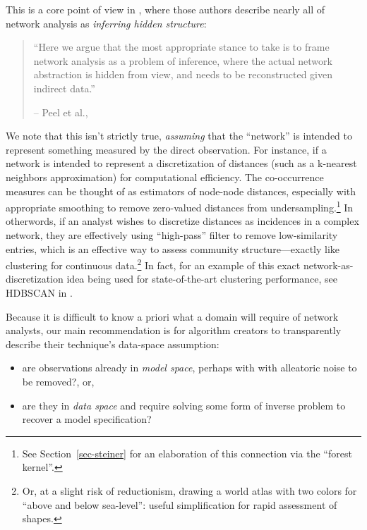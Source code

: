 \documentclass[%
	12pt,
		oneside,
		letterpaper
]{book}
\providecommand{\tightlist}{%
  \setlength{\itemsep}{0pt}\setlength{\parskip}{0pt}}\usepackage{longtable,booktabs,array}
\begin{document}
This is a core point of view in \textcite{Statisticalinferencelinks_Peel2022}, where those authors describe nearly all of network analysis as \emph{inferring hidden structure}:

\singlespacing

\begin{quote}
``Here we argue that the most appropriate stance to take is to frame network analysis as a problem of inference, where the actual network abstraction is hidden from view, and needs to be reconstructed given indirect data.''

\hfill -- Peel et al., \autocite{Statisticalinferencelinks_Peel2022}
\end{quote}

\doublespacing

We note that this isn't strictly true, \emph{assuming} that the ``network'' is intended to represent something measured by the direct observation.
For instance, if a network is intended to represent a discretization of distances (such as a k-nearest neighbors approximation) for computational efficiency.
The co-occurrence measures can be thought of as estimators of node-node distances, especially with appropriate smoothing to remove zero-valued distances from undersampling.\footnote{
  See Section~\ref{sec-steiner} for an elaboration of this connection via the ``forest kernel''.}
In otherwords, if an analyst wishes to discretize distances as incidences in a complex network, they are effectively using ``high-pass'' filter to remove low-similarity entries, which is an effective way to assess community structure---exactly like clustering for continuous data.\footnote{
  Or, at a slight risk of reductionism, drawing a world atlas with two colors for ``above and below sea-level'': useful simplification for rapid assessment of shapes.}
In fact, for an example of this exact network-as-discretization idea being used for state-of-the-art clustering performance, see HDBSCAN in \textcite{HybridApproachHierarchical_Malzer2020}.

Because it is difficult to know a priori what a domain will require of network analysts, our main recommendation is for algorithm creators to transparently describe their technique's data-space assumption:

\begin{itemize}
\tightlist
\item
  are observations already in \emph{model space}, perhaps with with alleatoric noise to be removed?, or,
\item
  are they in \emph{data space} and require solving some form of inverse problem to recover a model specification?
\end{itemize}
\end{document}
